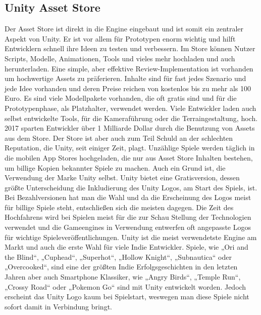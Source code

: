 \subsection{Unity Asset Store}
Der Asset Store ist direkt in die Engine eingebaut und ist somit ein zentraler Aspekt von Unity. Er ist vor allem für Prototypen enorm wichtig und hilft Entwicklern schnell ihre Ideen zu testen und verbessern. Im Store können Nutzer Scripts, Modelle, Animationen, Tools und vieles mehr hochladen und auch herunterladen. Eine simple, aber effektive Review-Implementation ist vorhanden um hochwertige Assets zu präferieren. Inhalte sind für fast jedes Szenario und jede Idee vorhanden und deren Preise reichen von kostenlos bis zu mehr als 100 Euro. Es sind viele Modellpakete vorhanden, die oft gratis sind und für die Prototypenphase, als Platzhalter, verwendet werden. Viele Entwickler laden auch selbst entwickelte Tools, für die Kameraführung oder die Terraingestaltung, hoch. 2017 sparten Entwickler über 1 Milliarde Dollar durch die Benutzung von Assets aus dem Store.
Der Store ist aber auch zum Teil Schuld an der schlechten Reputation, die Unity, seit einiger Zeit, plagt. Unzählige Spiele werden täglich in die mobilen App Stores hochgeladen, die nur aus Asset Store Inhalten bestehen, um billige Kopien bekannter Spiele zu machen. Auch ein Grund ist, die Verwendung der Marke Unity selbst. Unity bietet eine Gratisversion, dessen größte Unterscheidung die Inkludierung des Unity Logos, am Start des Spiels, ist. Bei Bezahlversionen hat man die Wahl und da die Erscheinung des Logos meist für billige Spiele steht, entschließen sich die meisten dagegen. Die Zeit des Hochfahrens wird bei Spielen meist für die zur Schau Stellung der Technologien verwendet und die Gameengines in Verwendung entwerfen oft angepasste Logos für wichtige Spieleveröffentlichungen. Unity ist die meist verwendetste Engine am Markt und auch die erste Wahl für viele Indie Entwickler. Spiele, wie „Ori and the Blind“, „Cuphead“, „Superhot“, „Hollow Knight“, „Subnautica“ oder „Overcooked“, sind eine der größten Indie Erfolgsgeschichten in den letzten Jahren aber auch Smartphone Klassiker, wie „Angry Birds“, „Temple Run“, „Crossy Road“ oder „Pokemon Go“ sind mit Unity entwickelt worden. Jedoch erscheint das Unity Logo kaum bei Spielstart, weswegen man diese Spiele nicht sofort damit in Verbindung bringt.

